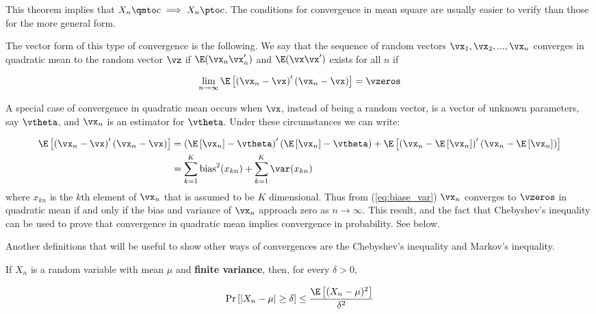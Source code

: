 This theorem implies that $X_n\qmto c \implies X_n\pto c$. The conditions for convergence in mean square are usually easier to verify than those for the more general form.

The vector form of this type of convergence is the following. We say that the sequence of random vectors $\vx_1, \vx_2,...,\vx_n$ converges in quadratic mean to the random vector $\vz$ if $\E(\vx_n\vx_n')$ and $\E(\vx\vx')$ exists for all $n$ if

\begin{equation*}
  \lim_{n\to \infty} \E\left[\left(\vx_n  - \vx\right)'\left(\vx_n  - \vx\right)\right] = \vzeros
\end{equation*}

A special case of convergence in quadratic mean occurs when $\vx$, instead of being a random vector, is a vector of unknown parameters, say $\vtheta$, and $\vx_n$ is an estimator for $\vtheta$. Under these circumstances we can write:

\begin{equation}\label{eq:biase_var}
  \begin{aligned}
    \E\left[\left(\vx_n  - \vx\right)'\left(\vx_n  - \vx\right)\right] & = \left(\E\left[\vx_n\right]  - \vtheta\right)'\left(\E\left[\vx_n\right]  - \vtheta\right) + \E\left[\left(\vx_n - \E\left[\vx_n\right]\right)'\left(\vx_n - \E\left[\vx_n\right]\right)\right] \\
    & = \sum_{k = 1}^K\mbox{bias}^2(x_{kn}) + \sum_{k = 1}^K \var(x_{kn})
  \end{aligned}
\end{equation}
%
where $x_{kn}$ is the $k$th element of $\vx_n$ that is assumed to be $K$ dimensional. Thus from (\ref{eq:biase_var}) $\vx_n$ converges to $\vzeros$ in quadratic mean if and only if the bias and variance of $\vx_n$ approach zero as $n\to\infty$. This result, and the fact that Chebyshev's inequality can be used to prove that convergence in quadratic mean implies convergence in probability. See below.

Another definitions that will be useful to show other ways of convergences are the Chebyshev's inequality and Markov's inequality.

\begin{definition}\label{definition:chebyshev_ineq}
	 If $X_n$ is a random variable with mean $\mu$ and \textbf{finite variance}, then, for every $\delta > 0$,
	 
	 \begin{equation*}
	 \Pr\left[\left| X_n - \mu\right|\geq \delta \right]\leq \frac{\E\left[(X_n - \mu)^2\right]}{\delta ^2}
	 \end{equation*}
\end{definition}

